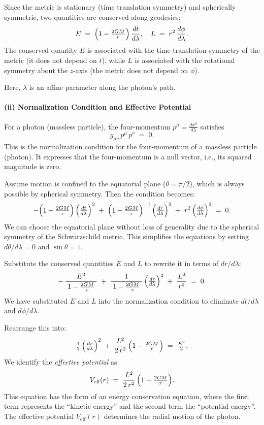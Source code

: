 Since the metric is stationary (time translation symmetry) and spherically symmetric, two quantities are conserved along geodesics:
\[
E \;=\; \Bigl(1 - \tfrac{2GM}{r}\Bigr)\,\frac{dt}{d\lambda},
\quad
L \;=\; r^{2}\,\frac{d\phi}{d\lambda}.
\]
The conserved quantity \(E\) is associated with the time translation symmetry of the metric (it does not depend on \(t\)), while \(L\) is associated with the rotational symmetry about the \(z\)-axis (the metric does not depend on \(\phi\)).

Here, \(\lambda\) is an affine parameter along the photon's path.

\paragraph{(ii) Normalization Condition and Effective Potential}
For a photon (massless particle), the four-momentum \(p^\mu = \frac{dx^\mu}{d\lambda}\) satisfies
\[
g_{\mu\nu}\,p^\mu\,p^\nu \;=\; 0.
\]
This is the normalization condition for the four-momentum of a massless particle (photon). It expresses that the four-momentum is a null vector, i.e., its squared magnitude is zero.

Assume motion is confined to the equatorial plane (\(\theta = \pi/2\)), which is always possible by spherical symmetry. Then the condition becomes:
\[
-\Bigl(1 - \tfrac{2GM}{r}\Bigr)\,\Bigl(\tfrac{dt}{d\lambda}\Bigr)^2
\;+\;
\Bigl(1 - \tfrac{2GM}{r}\Bigr)^{-1}\,\Bigl(\tfrac{dr}{d\lambda}\Bigr)^2
\;+\;
r^2\,\Bigl(\tfrac{d\phi}{d\lambda}\Bigr)^2
\;=\;0.
\]
We can choose the equatorial plane without loss of generality due to the spherical symmetry of the Schwarzschild metric. This simplifies the equations by setting \(d\theta/d\lambda = 0\) and \(\sin\theta = 1\).

Substitute the conserved quantities \(E\) and \(L\) to rewrite it in terms of \(dr/d\lambda\):
\[
-\,\frac{E^2}{\;1 - \frac{2GM}{r}\;}
\;+\;
\frac{1}{\;1 - \frac{2GM}{r}\;}\,\Bigl(\tfrac{dr}{d\lambda}\Bigr)^2
\;+\;
\frac{L^2}{\,r^2\,}
\;=\;0.
\]
We have substituted \(E\) and \(L\) into the normalization condition to eliminate \(dt/d\lambda\) and \(d\phi/d\lambda\).

Rearrange this into:
\[
\tfrac12\,\Bigl(\tfrac{dr}{d\lambda}\Bigr)^2
\;+\;
\frac{L^2}{2\,r^2}\,\Bigl(1-\tfrac{2GM}{r}\Bigr)
\;=\;
\tfrac{E^2}{2}.
\]
We identify the \emph{effective potential} as
\[
V_{\text{eff}}(r)
\;=\;
\frac{L^2}{2\,r^2}\,\Bigl(1-\tfrac{2GM}{r}\Bigr).
\]
This equation has the form of an energy conservation equation, where the first term represents the ``kinetic energy'' and the second term the ``potential energy''. The effective potential \(V_{\text{eff}}(r)\) determines the radial motion of the photon.

